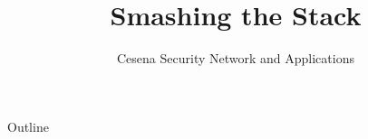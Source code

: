 \documentclass{beamer}
\title[]{Smashing the Stack}
\author[]{Cesena Security Network and Applications}
\institute[CeSeNA]
{
\emph{University of Bologna}\\
\emph{Ingegneria e Scienze Informatiche}
}
\begin{document}
{
  \begin{frame}
    \titlepage
  \end{frame}
}

\begin{frame}{Outline}
  \begin{multicols}{2}
    \tableofcontents
  \end{multicols}
\end{frame}









\end{document}
